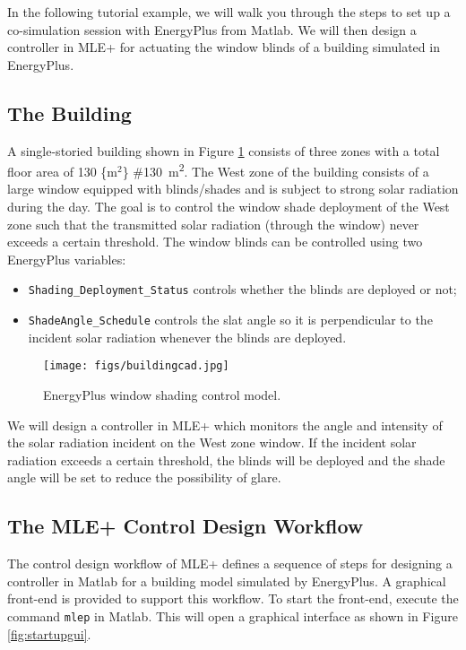 \documentclass[11pt]{article}
\begin{document}
In the following tutorial example, we will walk you through the steps
to set up a co-simulation session with EnergyPlus from Matlab.  We
will then design a controller in MLE+ for actuating the window blinds of a
building simulated in EnergyPlus.

\subsection{The Building}
\label{sec-4-1}

A single-storied building shown in Figure \ref{fig:buildingcad}
consists of three zones with a total floor area of 130 \{m$^{\text{2}}$\} 
\#\SI{130}{\meter\squared}.
The West zone of the building consists of a
large window equipped with blinds/shades and is subject to strong
solar radiation during the day.  The goal is to control the window
shade deployment of the West zone such that the transmitted solar
radiation (through the window) never exceeds a certain threshold.  The
window blinds can be controlled using two EnergyPlus variables:
\begin{itemize}
\item \texttt{Shading\_Deployment\_Status} controls whether the blinds are deployed
or not;
\item \texttt{ShadeAngle\_Schedule} controls the slat angle so it is perpendicular
to the incident solar radiation whenever the blinds are deployed.
\end{itemize}


\begin{figure}[htb]
\centering
\texttt{[image: figs/buildingcad.jpg]}
\caption{\label{fig:buildingcad}EnergyPlus window shading control model.}
\end{figure}

We will design a controller in MLE+ which monitors the angle and
intensity of the solar radiation incident on the West zone window.  If
the incident solar radiation exceeds a certain threshold, the blinds
will be deployed and the shade angle will be set to reduce the
possibility of glare.


\subsection{The MLE+ Control Design Workflow}
\label{sec-4-2}

The control design workflow of MLE+ defines a sequence of steps for
designing a controller in Matlab for a building model simulated by
EnergyPlus.  A graphical front-end is provided to support this
workflow.  To start the front-end, execute the command \texttt{mlep} in
Matlab. This will open a graphical interface as shown in Figure
\ref{fig:startupgui}.
\end{document}
